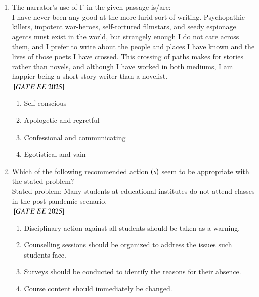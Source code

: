 \documentclass[journal,12pt,onecolumn]{IEEEtran}
\theoremstyle{remark}
\begin{document}
\begin{enumerate}
  \item The narrator's use of I' in the given passage is/are: \\   
 I have never been any good at the more lurid sort of writing. Psychopathic killers, impotent war-heroes, self-tortured filmstars, and seedy espionage agents must exist in the world, but strangely enough I do not care across them, and I prefer to write about the people and places I have known and the lives of those poets I have crossed. This crossing of paths makes for stories rather than novels, and although I have worked in both mediums, I am happier being a short-story writer than a novelist.\\

${}\left[GATE\ EE\ 2025\right]$\\
    \begin{enumerate}[label=(\Alph*)]
\item Self-conscious \
\item Apologetic and regretful 
\item Confessional and communicating 
\item Egotistical and vain
    \end{enumerate}

  \item Which of the following recommended action $\left(s\right)$ seem to be appropriate with the stated problem?  \\  
      Stated problem: Many students at educational institutes do not attend classes in the post-pandemic scenario. \\    
     ${}\left[GATE\ EE\ 2025\right]$\\
    \begin{enumerate}[label=(\Alph*)]
  \item Disciplinary action against all students should be taken as a warning.\\      
  \item Counselling sessions should be organized to address the issues such students face.\\   
  \item Surveys should be conducted to identify the reasons for their absence.\\   
  \item Course content should immediately be changed.\\   
    \end{enumerate}


\end{enumerate}
\end{document}
